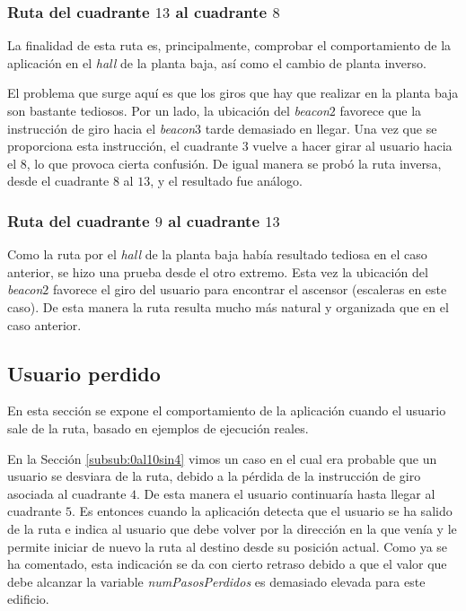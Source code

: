 \subsubsection{Ruta del cuadrante $13$ al cuadrante $8$}
\label{subsub:13al8}

La finalidad de esta ruta es, principalmente, comprobar el comportamiento de la aplicación en el \textit{hall} de la planta baja, así como el cambio de planta inverso. 

El problema que surge aquí es que los giros que hay que realizar en la planta baja son bastante tediosos. Por un lado, la ubicación del \textit{beacon$2$} favorece que la instrucción de giro hacia el \textit{beacon$3$} tarde demasiado en llegar. Una vez que se proporciona esta instrucción, el cuadrante $3$ vuelve a hacer girar al usuario hacia el $8$, lo que provoca cierta confusión. De igual manera se probó la ruta inversa, desde el cuadrante $8$ al $13$, y el resultado fue análogo.


\subsubsection{Ruta del cuadrante $9$ al cuadrante $13$}
\label{subsub:9al13}

Como la ruta por el \textit{hall} de la planta baja había resultado tediosa en el caso anterior, se hizo una prueba desde el otro extremo. Esta vez la ubicación del \textit{beacon$2$} favorece el giro del usuario para encontrar el ascensor (escaleras en este caso). De esta manera la ruta resulta mucho más natural y organizada que en el caso anterior.

\subsection{Usuario perdido}
\label{sub:usuarioPerdido}

En esta sección se expone el comportamiento de la aplicación cuando el usuario sale de la ruta, basado en ejemplos de ejecución reales. 

En la Sección \ref{subsub:0al10sin4} vimos un caso en el cual era probable que un usuario se desviara de la ruta, debido a la pérdida de la instrucción de giro asociada al cuadrante $4$. De esta manera el usuario continuaría hasta llegar al cuadrante $5$. Es entonces cuando la aplicación detecta que el usuario se ha salido de la ruta e indica al usuario que debe volver por la dirección en la que venía y le permite iniciar de nuevo la ruta al destino desde su posición actual. Como ya se ha comentado, esta indicación se da con cierto retraso debido a que el valor que debe alcanzar la variable \textit{numPasosPerdidos} es demasiado elevada para este edificio. 


